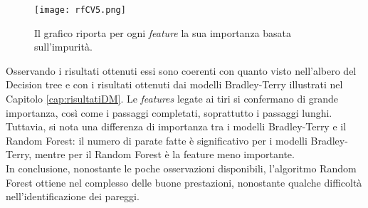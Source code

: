 \begin{figure}[]
	\begin{center}
		\texttt{[image: rfCV5.png]}
		\caption{Il grafico riporta per ogni \emph{feature} la sua importanza basata sull'impurità.
		} 
		\label{fig:rftree}
	\end{center}
\end{figure}
Osservando i risultati ottenuti essi sono coerenti con quanto visto nell'albero del Decision tree e con i risultati ottenuti dai modelli Bradley-Terry illustrati nel Capitolo \ref{cap:risultatiDM}. Le \emph{features} legate ai tiri si confermano di grande importanza, così come i passaggi completati, soprattutto i passaggi lunghi. Tuttavia, si nota una differenza di importanza tra i modelli Bradley-Terry e il Random Forest: il numero di parate fatte è significativo per i modelli Bradley-Terry, mentre per il Random Forest è la feature meno importante.\\
In conclusione, nonostante le poche osservazioni disponibili, l'algoritmo Random Forest ottiene nel complesso delle buone prestazioni, nonostante qualche difficoltà nell’identificazione dei pareggi.

